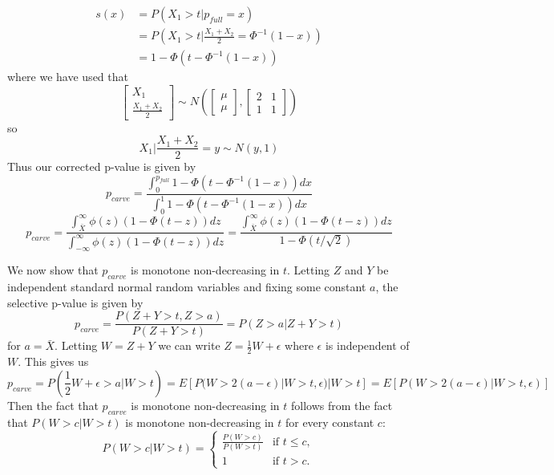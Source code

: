 \documentclass{article}
\begin{document}
\begin{appendix}
\begin{align*}
    s(x) &= P( X_1 > t | p_{full} = x ) \\
         &=  P( X_1 > t | \frac{X_1 + X_2}{2} =  \Phi^{-1}(1 -x) )\\
         &= 1 - \Phi(t - \Phi^{-1}(1 - x))
\end{align*}
where we have used that 
\begin{equation*}
    \begin{bmatrix}
    X_1 \\ \frac{X_1 + X_2}{2}
    \end{bmatrix} \sim N \left(\begin{bmatrix}
        \mu \\ \mu
        \end{bmatrix}, \begin{bmatrix}
            2  & 1 \\ 1 & 1
            \end{bmatrix} \right)
\end{equation*}
so 
\begin{equation*}
    X_1 | \frac{X_1 + X_2}{2} = y \sim N(y, 1)
\end{equation*}
Thus our corrected p-value is given by 
\begin{equation*}
    p_{carve} = \frac{\int_0^{p_{full}}  1 - \Phi(t - \Phi^{-1}(1-x) )   dx }{\int_0^1 1 - \Phi(t - \Phi^{-1}(1-x) ) dx}
\end{equation*}
\begin{equation*}
    p_{carve} = \frac{\int_{\bar{X}}^{\infty} \phi(z) (1 - \Phi(t - z))   dz }{\int_{-\infty}^{\infty} \phi(z) (1 - \Phi(t - z))  dz } = \frac{\int_{\bar{X}}^{\infty} \phi(z) (1 - \Phi(t - z))   dz }{1 - \Phi(t/\sqrt{2})   }
\end{equation*}

We now show that $p_{carve}$ is monotone non-decreasing in $t$. Letting $Z$ and $Y$ be independent standard normal random variables and fixing some constant $a$, the selective p-value is given by 
\begin{equation*}
   p_{carve} = \frac{P(Z + Y > t, Z > a)}{P(Z + Y > t)} = P(Z > a | Z + Y > t)
\end{equation*}
for $a = \bar{X}$. Letting $W = Z + Y$ we can write $Z = \frac{1}{2}W +\epsilon$ where $\epsilon$ is independent of $W$. This gives us 
\begin{equation*}
    p_{carve} = P(\frac{1}{2} W + \epsilon > a | W > t) = E[P(W > 2(a - \epsilon)| W > t, \epsilon)| W > t ] = E[P(W > 2(a - \epsilon)| W > t, \epsilon)]
\end{equation*}
Then the fact that $p_{carve}$ is monotone non-decreasing in $t$ follows from the fact that $P(W > c | W > t)$ is monotone non-decreasing in $t$ for every constant $c$:
\begin{equation*}
{P(W > c |W >t)} = \begin{cases} 
\frac{P(W > c)}{P(W > t)} & \text{if } t \leq c, \\
1 & \text{if } t > c.
\end{cases}
\end{equation*}


\end{appendix}
\end{document}
